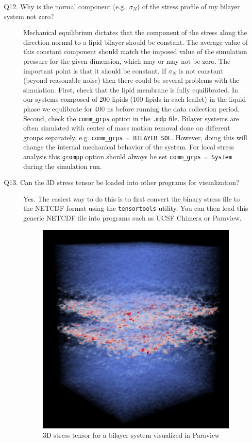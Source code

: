 \documentclass[10pt,letterpaper,notitlepage]{article}
\begin{document}
\begin{description}
\item[Q12. Why is the normal component (e.g.~$\sigma_{N}$) of the stress profile of my bilayer system not zero?] Mechanical equilibrium dictates that the component of the stress along the direction normal to a lipid bilayer should be constant. The average value of this constant component should match the imposed value of the simulation pressure for the given dimension, which may or may not be zero. The important point is that it should be constant. If $\sigma_{N}$ is not constant (beyond reasonable noise) then there could be several problems with the simulation. First, check that the lipid membrane is fully equilibrated. In our systems composed of 200 lipids (100 lipids in each leaflet) in the liquid phase we equlibrate for 400 ns before running the data collection period. Second, check the \texttt{comm\_grps} option in the \texttt{.mdp} file. Bilayer systems are often simulated with center of mass motion removal done on different groups separately, e.g. \texttt{comm\_grps = BILAYER SOL}. However, doing this will change the internal mechanical behavior of the system. For local stress analysis this \texttt{grompp} option should always be set \texttt{comm\_grps = System} during the simulation run.

\item[Q13. Can the 3D stress tensor be loaded into other programs for visualization?] Yes. The easiest way to do this is to first convert the binary stress file to the NETCDF format using the \texttt{tensortools} utility. You can then load this generic NETCDF file into programs such as UCSF Chimera or Paraview.

\begin{figure}[!h]
\centering
\includegraphics[width=4in]{figs/3D_stress_black_bw.pdf}
\caption{3D stress tensor for a bilayer system visualized in Paraview}
\end{figure}

\end{description}
\end{document}
